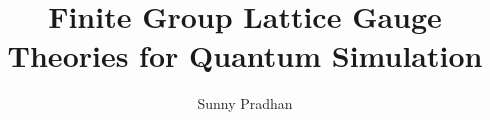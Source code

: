 
\usepackage[textwidth=400pt]{geometry}
\usepackage{layout} %

\usepackage[T1]{fontenc}
\usepackage{mlmodern}
\usepackage{helvet}


\hangsecnum


\usepackage{amsmath}
\usepackage{amssymb}
\usepackage{amsfonts}
\usepackage{physics}
\usepackage{bm}
\usepackage{slashed}

\newcommand{\R}{\mathbb{R}} %
\newcommand{\Z}{\mathbb{Z}} %
\newcommand{\phys}{\text{phys}} %
\newcommand{\W}{W_{\square}} %
\newcommand{\action}{\mathcal{S}} %


\usepackage{xcolor}
\usepackage{graphicx}
\usepackage{tikz}


\usepackage[colorlinks, linkcolor=blue]{hyperref}

\title{Finite Group Lattice Gauge Theories for Quantum Simulation}
\author{Sunny Pradhan}
\date{}

\newcommand{\todo}[1]{\textcolor{red}{[ \textsf{#1} ]}}
\newcommand{\citneeded}{\textcolor{red}{\textsf{\textsuperscript{[citation?]}}}}
